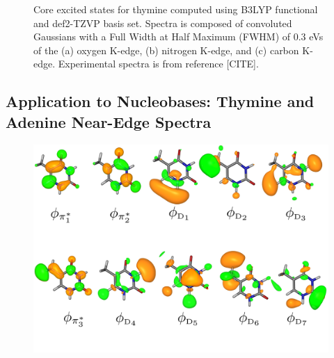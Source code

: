 \documentclass[12pt]{article}
\begin{document}
\begin{figure}[!ht]
\centering
\caption{Core excited states for thymine computed using B3LYP functional and def2-TZVP basis set. Spectra is composed of convoluted Gaussians with a Full Width at Half Maximum (FWHM) of 0.3 eVs of the (a) oxygen K-edge, (b) nitrogen K-edge, and (c) carbon K-edge. Experimental spectra is from reference [CITE].}
\label{figure:Thymine}
\end{figure}
\subsection{Application to Nucleobases: Thymine and Adenine Near-Edge Spectra}
\begin{figure}
\centering
\includegraphics[scale =0.5]{ThymineVirtuals.png}
\end{figure}
\end{document}
